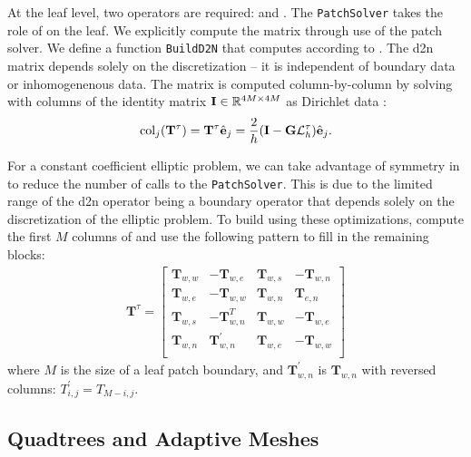 At the leaf level, two operators are required: \Stau and \Ttau. The \texttt{PatchSolver} takes the role of \Stau on the leaf. We explicitly compute the matrix \Ttau through use of the patch solver. We define a function \texttt{BuildD2N} that computes \Ttau according to . The \gls{d2n} matrix depends solely on the discretization -- it is independent of boundary data or inhomogenenous data. The matrix \Ttau is computed column-by-column by solving  with columns of the identity matrix $\textbf{I} \in \mathbb R^{4M \times 4M}$ as Dirichlet data \gtau:
\begin{align}
\text{col}_j (\mathbf T^{\tau}) = \mathbf T^{\tau} \hat{\textbf{e}}_j = \frac{2}{h} (\textbf{I} - \textbf{G} \mathcal{L}_h^{\tau}) \hat{\textbf{e}}_j.
\end{align}

For a constant coefficient elliptic problem, we can take advantage of symmetry in \Ttau to reduce the number of calls to the \texttt{PatchSolver}. This is due to the limited range of the \gls{d2n} operator being a boundary operator that depends solely on the discretization of the elliptic problem. To build \Ttau using these optimizations, compute the first $M$ columns of \Ttau and use the following pattern to fill in the remaining blocks:
\begin{align}
\textbf{T}^{\tau} =
\begin{bmatrix}
    \textbf{T}_{w,w} & -\textbf{T}_{w,e} & \textbf{T}_{w,s} & -\textbf{T}_{w,n} \\
    \textbf{T}_{w,e} & -\textbf{T}_{w,w} & \textbf{T}_{w,n} & \textbf{T}_{e,n} \\
    \textbf{T}_{w,s} & -\textbf{T}_{w,n}^T & \textbf{T}_{w,w} & -\textbf{T}_{w,e} \\
    \textbf{T}_{w,n} & \textbf{T}_{w,n}^{'} & \textbf{T}_{w,e} & -\textbf{T}_{w,w} \\
\end{bmatrix}
\end{align}
where $M$ is the size of a leaf patch boundary, and $\textbf{T}_{w,n}^{'}$ is $\textbf{T}_{w,n}$ with reversed columns: $T_{i,j}^{'} = T_{M-i,j}$.

\subsection{Quadtrees and Adaptive Meshes}

